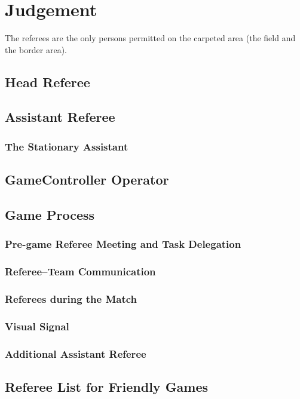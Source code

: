 \section{Judgement}
\label{sec:judgement}

The referees are the only persons permitted on the carpeted area (\ie the field and the border area).

\subsection{Head Referee}
\label{sec:head_referee}

\subsection{Assistant  Referee}
\label{sec:assistant_referee}

\subsubsection{The Stationary Assistant}

\subsection{GameController Operator}
\label{sec:gamecontroller_operator}

\subsection{Game Process}

\subsubsection{Pre-game Referee Meeting and Task Delegation}
\label{sec:referee_delegation}

\subsubsection{Referee--Team Communication}
\label{sec:referee_team_communication}

\subsubsection{Referees during the Match}
\label{sec:referee_during_match}

\subsubsection{Visual Signal}
\label{sec:referee_visual_signal}

\subsubsection{Additional Assistant Referee}
\label{sec:additional_assistant_referee}

\subsection{Referee List for Friendly Games}
\label{sec:referee_list}

